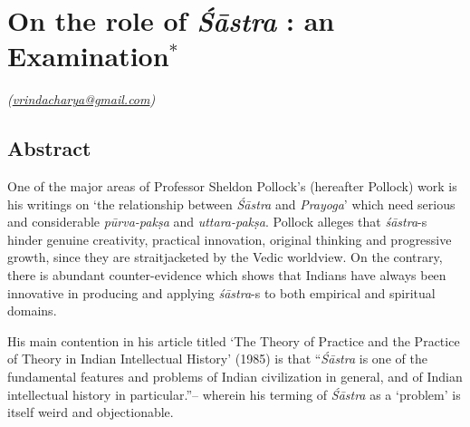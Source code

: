 \chapter{On the role of {\sl\bfseries Śāstra} : an Examination$^{*}$}\label{chapter\thechapter:begin}
\vskip -10pt



\hfill{\sl(\url{vrindacharya@gmail.com})}


\section*{Abstract}

One of the major areas of Professor Sheldon Pollock's (hereafter Pollock) work is his writings on `the relationship between {\it Śāstra} and {\it Prayoga}' which need serious and considerable {\it pūrva-pakṣa} and {\it uttara-pakṣa}. Pollock alleges that {\it śāstra}-s hinder genuine creativity, practical innovation, original thinking and progressive growth, since they are straitjacketed by the Vedic worldview. On the contrary, there is abundant counter-evidence which shows that Indians have always been innovative in producing and applying {\it śāstra}-s to both empirical and spiritual domains. 

His main contention in his article titled `The Theory of Practice and the Practice of Theory in Indian Intellectual History' (1985) is that ``{\it Śāstra} is one of the fundamental features and problems of Indian civilization in general, and of Indian intellectual history in particular.''-- wherein his terming of {\it Śāstra} as a `problem' is itself weird and objectionable.  

